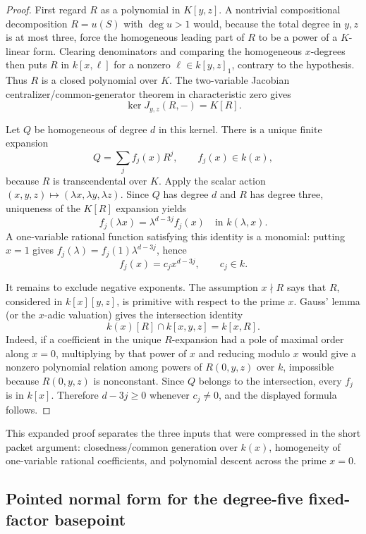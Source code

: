 \begin{proof}
First regard $R$ as a polynomial in $K[y,z]$.  A nontrivial compositional
decomposition $R=u(S)$ with $\deg u>1$ would, because the total degree in
$y,z$ is at most three, force the homogeneous leading part of $R$ to be a
power of a $K$-linear form.  Clearing denominators and comparing the
homogeneous $x$-degrees then puts $R$ in $k[x,\ell]$ for a nonzero
$\ell\in k[y,z]_1$, contrary to the hypothesis.  Thus $R$ is a closed
polynomial over $K$.  The two-variable Jacobian centralizer/common-generator
theorem in characteristic zero gives
\[
\ker J_{y,z}(R,-)=K[R].
\]

Let $Q$ be homogeneous of degree $d$ in this kernel.  There is a unique finite
expansion
\[
Q=\sum_j f_j(x)R^j,\qquad f_j(x)\in k(x),
\]
because $R$ is transcendental over $K$.  Apply the scalar action
$(x,y,z)\mapsto(\lambda x,\lambda y,\lambda z)$.  Since $Q$ has degree $d$
and $R$ has degree three, uniqueness of the $K[R]$ expansion yields
\[
f_j(\lambda x)=\lambda^{d-3j}f_j(x)
\quad\text{in }k(\lambda,x).
\]
A one-variable rational function satisfying this identity is a monomial:
putting $x=1$ gives $f_j(\lambda)=f_j(1)\lambda^{d-3j}$, hence
\[
f_j(x)=c_jx^{d-3j},\qquad c_j\in k.
\]

It remains to exclude negative exponents.  The assumption $x\nmid R$ says
that $R$, considered in $k[x][y,z]$, is primitive with respect to the prime
$x$.  Gauss' lemma (or the $x$-adic valuation) gives the intersection
identity
\[
k(x)[R]\cap k[x,y,z]=k[x,R].
\]
Indeed, if a coefficient in the unique $R$-expansion had a pole of maximal
order along $x=0$, multiplying by that power of $x$ and reducing modulo $x$
would give a nonzero polynomial relation among powers of
$R(0,y,z)$ over $k$, impossible because $R(0,y,z)$ is nonconstant.  Since
$Q$ belongs to the intersection, every $f_j$ is in $k[x]$.  Therefore
$d-3j\ge0$ whenever $c_j\ne0$, and the displayed formula follows.
\end{proof}

This expanded proof separates the three inputs that were compressed in the
short packet argument: closedness/common generation over $k(x)$, homogeneity
of one-variable rational coefficients, and polynomial descent across the
prime $x=0$.

\subsection{Pointed normal form for the degree-five fixed-factor basepoint}

